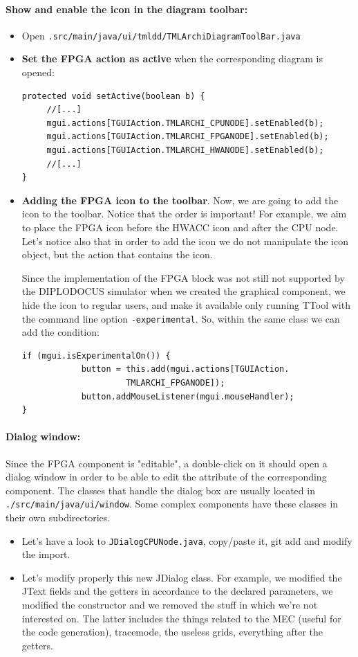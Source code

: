 \documentclass[12pt]{article}
\begin{document}
\paragraph{Show and enable the icon in the diagram toolbar: }
\begin{itemize}
\item Open \texttt{.src/main/java/ui/tmldd/TMLArchiDiagramToolBar.java}
\item \textbf{Set the FPGA action as active} when the corresponding diagram is opened:
\begin{lstlisting}
protected void setActive(boolean b) {
     //[...]
     mgui.actions[TGUIAction.TMLARCHI_CPUNODE].setEnabled(b);
     mgui.actions[TGUIAction.TMLARCHI_FPGANODE].setEnabled(b);
     mgui.actions[TGUIAction.TMLARCHI_HWANODE].setEnabled(b);		
     //[...]
}		
\end{lstlisting}
\item\textbf{ Adding the FPGA icon to the toolbar}. 
Now, we are going to add the icon to the toolbar. 
Notice that the order is important! For example, we aim to place the FPGA icon before the HWACC icon and after the CPU node. Let's notice also that in order to add the icon we do not manipulate the icon object, but the action that contains the icon.
 
Since the implementation of the FPGA block was not still not supported by the DIPLODOCUS simulator when we created the graphical component, we hide the icon to regular users, and make it available only running TTool with the command line option \texttt{-experimental}. So, within the same class we can add the condition:
\begin{lstlisting}
if (mgui.isExperimentalOn()) {
            button = this.add(mgui.actions[TGUIAction.
                     TMLARCHI_FPGANODE]);
            button.addMouseListener(mgui.mouseHandler);
}
\end{lstlisting}
\end{itemize}

\paragraph{Dialog window:} Since the FPGA component is "editable", a double-click on it should open a dialog window in order to be able to edit the attribute of the corresponding component. The classes that handle the dialog box are usually located in \texttt{./src/main/java/ui/window}. Some complex components have these classes in their own subdirectories. 
\begin{itemize}
\item Let's have a look to \texttt{JDialogCPUNode.java}, copy/paste it, git add and modify the import.
\item Let's modify properly this new JDialog class. For example, we modified the JText fields and the getters in accordance to the declared parameters, we modified the constructor and we removed the stuff in which we're not interested on. The latter includes the things related to the MEC (useful for the code generation), tracemode, the useless grids, everything after the getters. 
\end{itemize}
\end{document}

